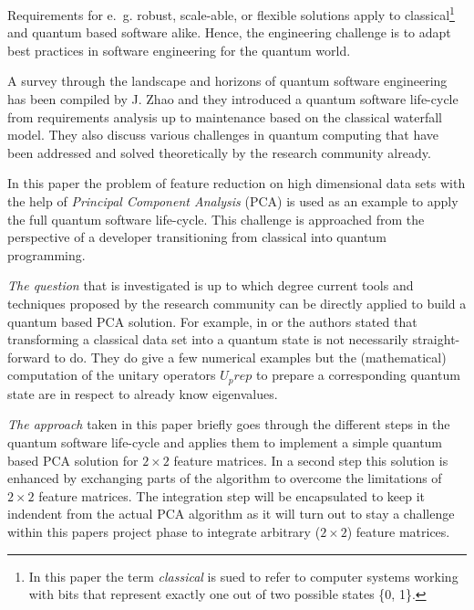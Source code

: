 
Requirements for e.~g. robust, scale-able, or flexible solutions apply to classical\footnote{In this paper the term \emph{classical} is sued to refer to computer systems working with bits that represent exactly one out of two possible states \{0, 1\}.} and quantum based software alike. Hence, the engineering challenge is to adapt best practices in software engineering for the quantum world.

A survey through the landscape and horizons of quantum software engineering has been compiled by J. Zhao \cite{Zhao_2020} and they introduced a quantum software life-cycle from requirements analysis up to maintenance based on the classical waterfall model. They also discuss various challenges in quantum computing that have been addressed and solved theoretically by the research community already.


In this paper the problem of feature reduction on high dimensional data sets with the help of \emph{Principal Component Analysis} (PCA) is used as an example to apply the full quantum software life-cycle. This challenge is approached from the perspective of a developer transitioning from classical into quantum programming.

\emph{The question} that is investigated is up to which degree current tools and techniques proposed by the research community can be directly applied to build a quantum based PCA solution. For example, in \cite{He_2021} or \cite{Daski_2015} the authors stated that transforming a classical data set into a quantum state is not necessarily straight-forward to do. They do give a few numerical examples but the (mathematical) computation of the unitary operators $U_prep$ to prepare a corresponding quantum state are in respect to already know eigenvalues.

\emph{The approach} taken in this paper briefly goes through the different steps in the quantum software life-cycle and applies them to implement a simple quantum based PCA solution for $2 \times 2$ feature matrices. In a second step this solution is enhanced by exchanging parts of the algorithm to overcome the limitations of $2 \times 2$ feature matrices. The integration step will be encapsulated to keep it indendent from the actual PCA algorithm as it will turn out to stay a challenge within this papers project phase to integrate arbitrary ($2 \times 2$) feature matrices.


